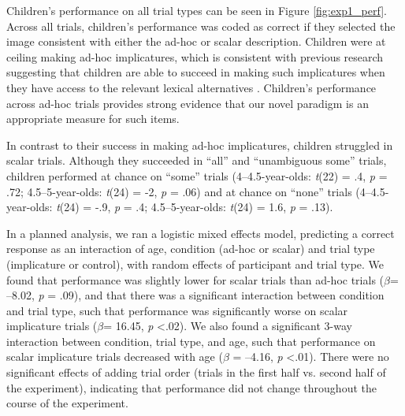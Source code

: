 \documentclass[man]{apa2}
\begin{document}
Children's performance on all trial types can be seen in Figure \ref{fig:exp1_perf}. Across all trials, children's performance was coded as correct if they selected the image consistent with either the ad-hoc or scalar description. Children were at ceiling making ad-hoc implicatures, which is consistent with previous research suggesting that children are able to succeed in making such implicatures when they have access to the relevant lexical alternatives \cite{stiller2014}. Children's performance across ad-hoc trials provides strong evidence that our novel paradigm is an appropriate measure for such items.

In contrast to their success in making ad-hoc implicatures, children struggled in scalar trials. Although they succeeded in ``all'' and ``unambiguous some'' trials, children performed at chance on ``some'' trials (4--4.5-year-olds: \emph{t}(22) = .4, \emph{p} = .72; 4.5--5-year-olds: \emph{t}(24) = -2, \emph{p} =  .06) and at chance on ``none'' trials (4--4.5-year-olds: \emph{t}(24) = -.9, \emph{p} = .4; 4.5--5-year-olds: \emph{t}(24) = 1.6, \emph{p} = .13). 
	
In a planned analysis, we ran a logistic mixed effects model, predicting a correct response as an interaction of age, condition (ad-hoc or scalar) and trial type (implicature or control), with random effects of participant and trial type. We found that performance was slightly lower for scalar trials than ad-hoc trials ($\beta$= --8.02, \textit{p} = .09), and that there was a significant interaction between condition and trial type, such that performance was significantly worse on scalar implicature trials ($\beta$= 16.45, \textit{p} \textless  .02). We also found a significant 3-way interaction between condition, trial type, and age, such that performance on scalar implicature trials decreased with age ($\beta$ = --4.16, \textit{p} \textless  .01). There were no significant effects of adding trial order (trials in the first half vs. second half of the experiment), indicating that performance did not change throughout the course of the experiment. 
\end{document}
